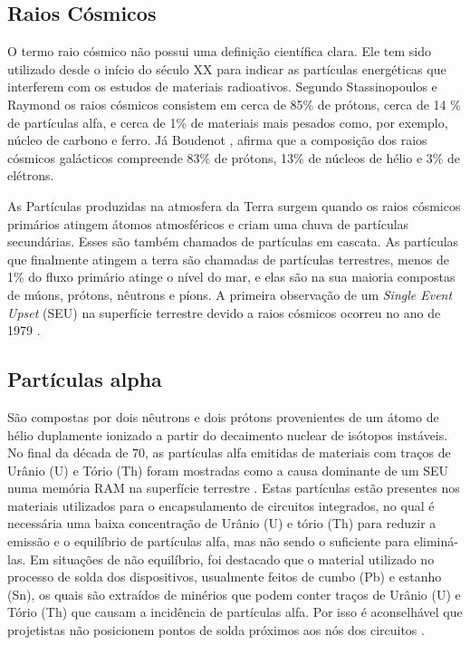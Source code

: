 \subsection{Raios Cósmicos} \label{subsec:raiosCosmicos}

O termo raio cósmico não possui uma definição científica clara. Ele tem sido utilizado desde o início do século XX para indicar as partículas energéticas que interferem com os estudos de materiais radioativos. Segundo Stassinopoulos e Raymond \cite{Stassinopoulos:1988} os raios cósmicos consistem em cerca de 85\% de prótons, cerca de 14 \% de partículas alfa, e cerca de 1\% de materiais mais pesados como, por exemplo, núcleo de carbono e ferro. Já Boudenot \cite{Boudenot:2007}, afirma que a composição dos raios cósmicos galácticos compreende 83\% de prótons, 13\% de núcleos de hélio e 3\% de elétrons. 

As Partículas produzidas na atmosfera da Terra surgem quando os raios cósmicos primários atingem átomos atmosféricos e criam uma chuva de partículas secundárias. Esses são também chamados de partículas em cascata. As partículas que finalmente atingem a terra são chamadas de partículas terrestres, menos de 1\% do fluxo primário atinge o nível do mar, e elas são na sua maioria compostas de múons, prótons, nêutrons e píons. A primeira observação de um \textit{Single Event Upset} (SEU) na superfície terrestre devido a raios cósmicos ocorreu no ano de 1979 \cite{ZieglerLandFord:1979}.


\subsection{Partículas alpha}

São compostas por dois nêutrons e dois prótons provenientes de um átomo de hélio duplamente ionizado a partir do decaimento nuclear de isótopos instáveis. No final da década de 70, as partículas alfa emitidas de materiais com traços de Urânio (U) e Tório (Th) foram mostradas como a causa dominante de um SEU numa memória RAM na superfície terrestre \cite{Woods:1978}. Estas partículas estão presentes nos materiais utilizados para o encapsulamento de circuitos integrados, no qual é necessária uma baixa concentração de Urânio (U) e tório (Th) para reduzir a emissão e o equilíbrio de partículas alfa, mas não sendo o suficiente para eliminá-las. Em situações de não equilíbrio, foi destacado que o material utilizado no processo de solda dos dispositivos, usualmente feitos de cumbo (Pb) e estanho (Sn), os quais são extraídos de minérios que podem conter traços de Urânio (U) e Tório (Th) que causam a incidência de partículas alfa. Por isso é aconselhável que projetistas não posicionem pontos de solda próximos aos nós dos circuitos \cite{Velazco:2007}.


